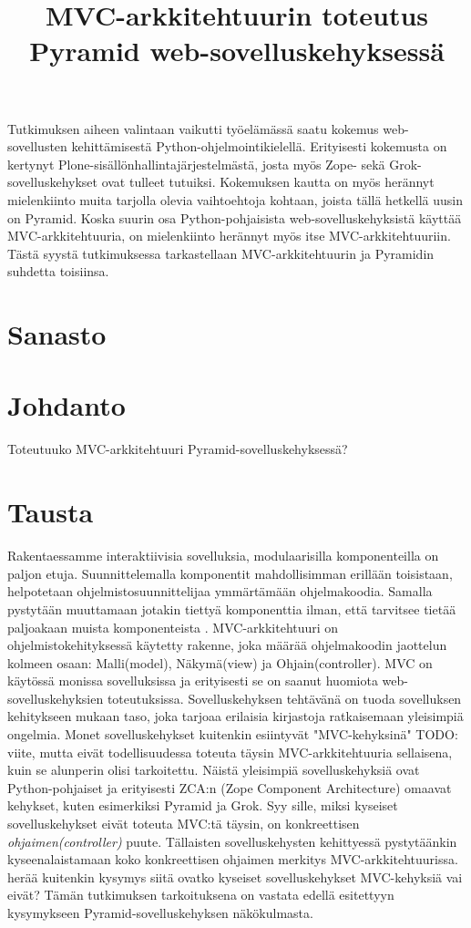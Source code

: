 \documentclass[finnish,utf8,nonumbib,palatino,kandi]{gradu2}
\title{MVC-arkkitehtuurin toteutus Pyramid web-sovelluskehyksessä}
\begin{document}
\preface

Tutkimuksen aiheen valintaan vaikutti työelämässä saatu
 kokemus web-sovellusten kehittämisestä Python-ohjelmointikielellä. Erityisesti
kokemusta on kertynyt Plone-sisällönhallintajärjestelmästä, josta myös Zope- sekä
Grok-sovelluskehykset ovat tulleet tutuiksi. Kokemuksen kautta on myös herännyt mielenkiinto
muita tarjolla olevia vaihtoehtoja kohtaan, joista tällä hetkellä uusin on Pyramid. Koska suurin osa Python-pohjaisista
web-sovelluskehyksistä käyttää MVC-arkkitehtuuria, on mielenkiinto herännyt myös itse MVC-arkkitehtuuriin. Tästä syystä
tutkimuksessa tarkastellaan MVC-arkkitehtuurin ja Pyramidin suhdetta toisiinsa.

\mainmatter
\section{Sanasto}

\section{Johdanto}
Toteutuuko MVC-arkkitehtuuri Pyramid-sovelluskehyksessä?

\section{Tausta}
Rakentaessamme interaktiivisia sovelluksia, modulaarisilla komponenteilla on paljon etuja. Suunnittelemalla komponentit mahdollisimman erillään toisistaan, helpotetaan
ohjelmistosuunnittelijaa ymmärtämään ohjelmakoodia. Samalla pystytään muuttamaan jotakin tiettyä komponenttia ilman, että tarvitsee tietää paljoakaan muista komponenteista \cite{Krasner:desc}.
MVC-arkkitehtuuri on ohjelmistokehityksessä käytetty rakenne, joka määrää ohjelmakoodin jaottelun kolmeen osaan: Malli(model), Näkymä(view) ja Ohjain(controller). MVC on käytössä monissa sovelluksissa ja erityisesti se on saanut
huomiota web-sovelluskehyksien toteutuksissa. Sovelluskehyksen tehtävänä on tuoda sovelluksen kehitykseen mukaan
taso, joka tarjoaa erilaisia kirjastoja ratkaisemaan yleisimpiä ongelmia. Monet sovelluskehykset kuitenkin esiintyvät "MVC-kehyksinä" TODO: viite, mutta eivät 
todellisuudessa toteuta täysin MVC-arkkitehtuuria sellaisena, kuin se alunperin olisi tarkoitettu. Näistä yleisimpiä sovelluskehyksiä ovat Python-pohjaiset
ja erityisesti ZCA:n (Zope Component Architecture) omaavat kehykset, kuten esimerkiksi Pyramid ja Grok. Syy sille, miksi
kyseiset sovelluskehykset eivät toteuta MVC:tä täysin, on konkreettisen \emph{ohjaimen(controller)} puute. Tällaisten
sovelluskehysten kehittyessä pystytäänkin kyseenalaistamaan koko konkreettisen ohjaimen merkitys MVC-arkkitehtuurissa.
herää kuitenkin kysymys siitä ovatko kyseiset sovelluskehykset MVC-kehyksiä vai eivät? Tämän tutkimuksen tarkoituksena on vastata edellä esitettyyn
kysymykseen Pyramid-sovelluskehyksen näkökulmasta.
\end{document}
